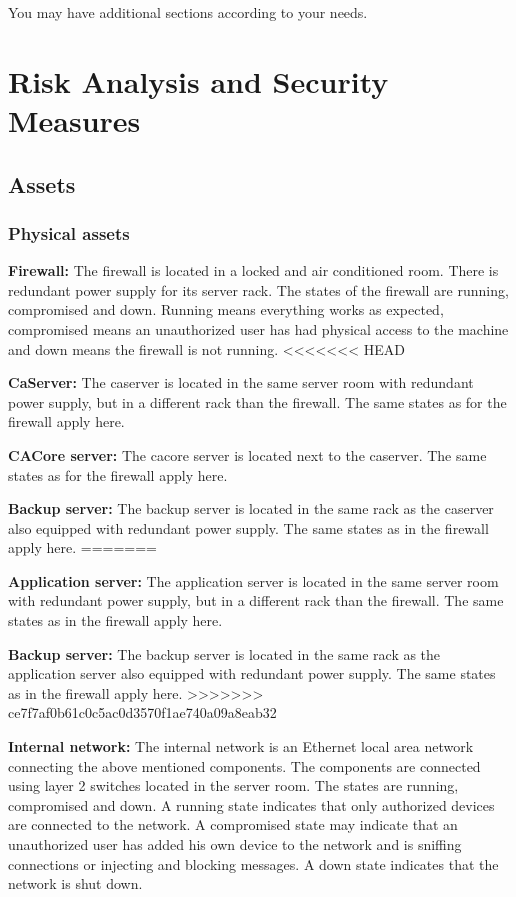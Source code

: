 \documentclass[english]{article}
\begin{document}
You may have additional sections according to your needs.


\section{Risk Analysis and Security Measures}

\subsection{Assets}

\subsubsection{Physical assets}

	\begin{description}
		\item{\textbf{Firewall:}} The firewall is located in a locked and air conditioned room. There is redundant power supply for its server rack. The states of the firewall are running, compromised and down. Running means everything works as expected, compromised means an unauthorized user has had physical access to the machine and down means the firewall is not running.
<<<<<<< HEAD
		\item{\textbf{CaServer:}} The caserver is located in the same server room with redundant power supply, but in a different rack than the firewall. The same states as for the firewall apply here.
		\item{\textbf{CACore server:}} The cacore server is located next to the caserver. The same states as for the firewall apply here.
		\item{\textbf{Backup server:}} The backup server is located in the same rack as the caserver also equipped with redundant power supply. The same states as in the firewall apply here.
=======
		\item{\textbf{Application server:}} The application server is located in the same server room with redundant power supply, but in a different rack than the firewall. The same states as in the firewall apply here.
		\item{\textbf{Backup server:}} The backup server is located in the same rack as the application server also equipped with redundant power supply. The same states as in the firewall apply here.
>>>>>>> ce7f7af0b61c0c5ac0d3570f1ae740a09a8eab32
		\item{\textbf{Internal network:}} The internal network is an Ethernet local area network connecting the above mentioned components. The components are connected using layer 2 switches located in the server room. The states are running, compromised and down. A running state indicates that only authorized devices are connected to the network. A compromised state may indicate that an unauthorized user has added his own device to the network and is sniffing connections or injecting and blocking messages. A down state indicates that the network is shut down.

\end{description}
\end{document}
